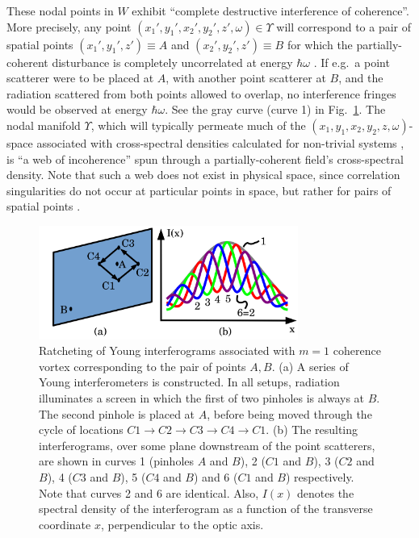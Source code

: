 \documentclass[%
 reprint,
 amsmath,amssymb,
 aps,
]{revtex4-1}
\begin{document}
These nodal points in $W$ exhibit ``complete destructive interference of coherence''.  More precisely, any point $(x_1',y_1',x_2',y_2',z',\omega)\in\Upsilon$ will correspond to a pair of spatial points $(x_1',y_1',z')\equiv A$ and $(x_2',y_2',z')\equiv B$ for which the partially-coherent disturbance is completely uncorrelated at energy $\hbar\omega$ \cite{Schouten2003,GburVisser2003,Bogatyryova2003}.  If e.g.~a point scatterer were to be placed at $A$, with another point scatterer at $B$, and the radiation scattered from both points allowed to overlap, no interference fringes would be observed at energy $\hbar\omega$.  See the gray curve (curve 1) in Fig.~\ref{Young_fringe_anholonomy}.  The nodal  manifold  $\Upsilon$, which will typically permeate much of the $(x_1,y_1,x_2,y_2,z,\omega)$-space associated with cross-spectral densities calculated for non-trivial systems \cite{TopologicalReactionsCohVortices,GburVisser2003}, is ``a web of incoherence'' spun through a partially-coherent field's cross-spectral density. Note that such a web does not exist in physical space, since correlation singularities do not occur at particular points in space, but rather for pairs of spatial points \cite{GburVisser2003}.   

\begin{figure}
\includegraphics[width=8.5cm]{Figures/Anholonomy.png}
\caption{Ratcheting of Young interferograms associated with $m=1$ coherence vortex corresponding to the pair of points $A,B$.  (a) A series of Young interferometers is constructed.  In all setups, radiation illuminates a screen in which the first of two pinholes is always at $B$.  The second pinhole is placed at $A$, before being moved through the cycle of locations $C1 \rightarrow C2 \rightarrow C3 \rightarrow C4 \rightarrow C1$.  (b) The resulting interferograms, over some plane downstream of the point scatterers, are shown in curves 1 (pinholes $A$ and $B$), 2 ($C1$ and $B$), 3 ($C2$ and $B$), 4 ($C3$ and $B$), 5 ($C4$ and $B$) and 6 ($C1$ and $B$) respectively. Note that curves 2 and 6 are identical.  Also, $I(x)$ denotes the spectral density of the interferogram as a function of the transverse coordinate $x$, perpendicular to the optic axis.}
\label{Young_fringe_anholonomy}
\end{figure}
\end{document}
